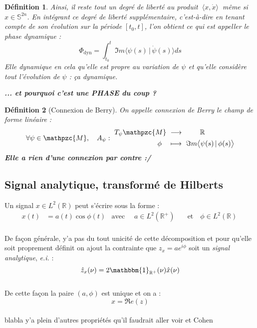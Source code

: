 \documentclass[hidelinks, french, oneside]{article}
\newcommand{\R}{\mathbb{R}}
\renewcommand{\S}{\mathbb{S}}
\newcommand{\lr}{\longrightarrow}
\newcommand{\phased}{\Phi_{\text{dyn}}}
\theoremstyle{enonce}
\newtheorem{definition}{Définition}
\theoremstyle{special}
\theoremstyle{rqlike}
\theoremstyle{exo}
\theoremstyle{demo}
\begin{document}
\begin{definition}\label{def:phase_dyn}
	Ainsi, il reste tout un degré de liberté au produit $\ \langle x, \dot{x} \rangle\ $ même si $x\in\S^{2n}$. En intégrant ce degré de liberté supplémentaire, c'est-à-dire en tenant compte de son évolution sur la période $[t_0,t]$, l'on obtient ce qui est appeller le \textit{phase dynamique} :
	\[\phased = \int_{t_0}^t \Im m \big\langle \psi(s) \, |\, \dot{\psi}(s) \big\rangle ds\]
	Elle dynamique en cela qu'elle est propre au variation de $\psi$ et qu'elle considère tout l'évolution de $\psi$ : ça dynamique.
	
	\textbf{... et pourquoi c'est une PHASE du coup ?}
\end{definition}


\begin{definition}[Connexion de Berry]\label{def:berry_connx}
On appelle \textit{connexion de Berry} le champ de forme linéaire :
\begin{equation}\label{eq:berry_connx}
	\forall \psi\in\mathpzc{M},\quad A_\psi :\ \begin{aligned} T_\psi\mathpzc{M}\ &\lr\qquad\ \R \\ \phi\quad &\longmapsto\ \Im m \big\langle \psi(s) \, |\, \phi(s) \big\rangle
	\end{aligned}
\end{equation}
\textbf{Elle a rien d'une connexion par contre :/}
\end{definition}




\subsection{Signal analytique, transformé de Hilberts}\label{subsec:SA_Hilb}

Un signal $x\in L^2(\R)$ peut s'écrire sous la forme :
\begin{align*}
	x(t) &= a(t) \cos\phi(t)  &  	\text{avec }\quad a \in L^2(\R^+)\quad &\text{et}\quad \phi \in L^2(\R) \
\end{align*}
\\
De façon générale, y'a pas du tout unicité de cette décomposition et pour qu'elle soit proprement définit on ajout la contrainte que $z_x=ae^{i\phi}$ soit un \textit{signal analytique}, \textit{e.i.} :
\[\hat{z}_x(\nu) = 2\mathbbm{1}_{\R^+}(\nu)\hat{x}(\nu)\]
\\
De cette façon la paire $(a,\phi)$ est unique et on a :
\[x = \Re e (z) \]
\\
blabla y'a plein d'autres propriétés qu'il faudrait aller voir \cite{picinbono_instantaneous_1997} et Cohen
\end{document}
